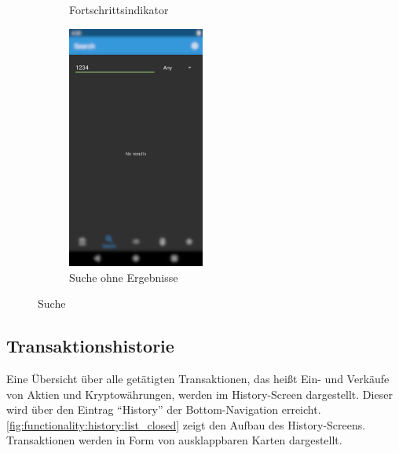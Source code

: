 \documentclass[a4paper]{article}
\begin{document}
\begin{figure}[H]
\begin{subfigure}{.5\textwidth}
		\caption{Fortschrittsindikator}
		\label{fig:functionality:search:loading}
	\end{subfigure}
	\begin{subfigure}{.5\textwidth}
		\centering
		\includegraphics[height=8cm,keepaspectratio]{./images/search/no_results.png}
		\caption{Suche ohne Ergebnisse}
		\label{fig:functionality:search:no-results}
	\end{subfigure}
	\caption{Suche}
	\label{fig:functionality:search}
\end{figure}


\subsection{Transaktionshistorie}
\label{subsec:functionality:history}
Eine Übersicht über alle getätigten Transaktionen, das heißt Ein- und Verkäufe von Aktien und Kryptowährungen, werden im History-Screen dargestellt. Dieser wird über den Eintrag "`History"' der Bottom-Navigation erreicht. \autoref{fig:functionality:history:list_closed} zeigt den Aufbau des History-Screens. Transaktionen werden in Form von ausklappbaren Karten dargestellt.
\end{document}
